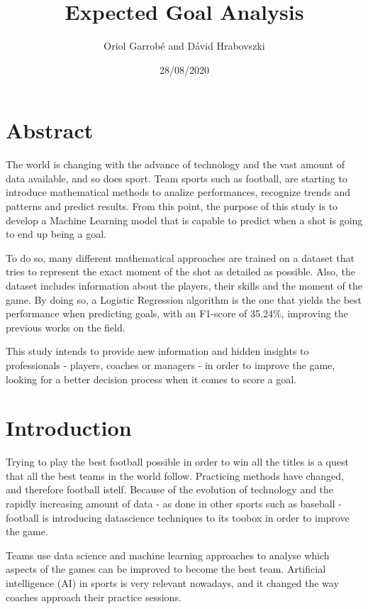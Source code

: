 \documentclass[]{article}
\title{Expected Goal Analysis}
\author{Oriol Garrobé and Dávid Hrabovszki}
\date{28/08/2020}
\begin{document}
\maketitle

\hypertarget{abstract}{%
\section{Abstract}\label{abstract}}

The world is changing with the advance of technology and the vast amount
of data available, and so does sport. Team sports such as football, are
starting to introduce mathematical methods to analize performances,
recognize trends and patterns and predict results. From this point, the
purpose of this study is to develop a Machine Learning model that is
capable to predict when a shot is going to end up being a goal.

To do so, many different mathematical approaches are trained on a
dataset that tries to represent the exact moment of the shot as detailed
as possible. Also, the dataset includes information about the players,
their skills and the moment of the game. By doing so, a Logistic
Regression algorithm is the one that yields the best performance when
predicting goals, with an F1-score of 35.24\%, improving the previous
works on the field.

This study intends to provide new information and hidden insights to
professionals - players, coaches or managers - in order to improve the
game, looking for a better decision process when it comes to score a
goal.

\hypertarget{introduction}{%
\section{Introduction}\label{introduction}}

Trying to play the best football possible in order to win all the titles
is a quest that all the best teams in the world follow. Practicing
methods have changed, and therefore football istelf. Because of the
evolution of technology and the rapidly increasing amount of data - as
done in other sports such as baseball - football is introducing
datascience techniques to its toobox in order to improve the game.

Teams use data science and machine learning approaches to analyse which
aspects of the games can be improved to become the best team. Artificial
intelligence (AI) in sports is very relevant nowadays, and it changed
the way coaches approach their practice sessions.
\end{document}

